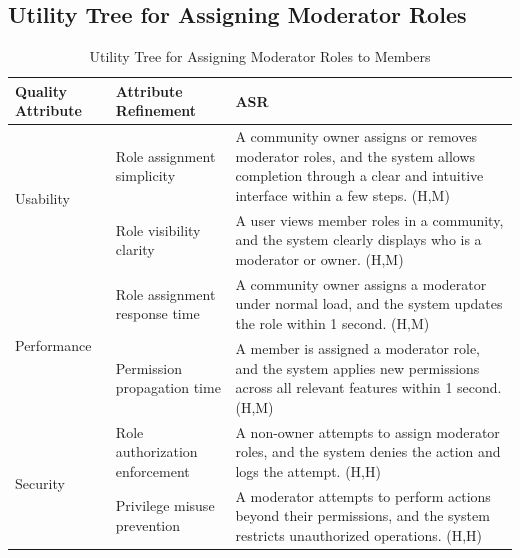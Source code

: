 \documentclass{article}
\begin{document}
\subsection{Utility Tree for Assigning Moderator Roles}

\begin{table}[H]
    \centering
    \caption{Utility Tree for Assigning Moderator Roles to Members}
    \begin{tabular}{|p{3cm}|p{4cm}|p{7cm}|}
        \hline
        \textbf{Quality Attribute} & \textbf{Attribute Refinement}                                                                                                                            & \textbf{ASR} \\
        \hline

        \multirow{2}{*}{Usability}
                                   & Role assignment simplicity
                                   & A community owner assigns or removes moderator roles, and the system allows completion through a clear and intuitive interface within a few steps. (H,M)                \\
        \cline{2-3}
                                   & Role visibility clarity
                                   & A user views member roles in a community, and the system clearly displays who is a moderator or owner. (H,M)                                                            \\
        \hline

        \multirow{2}{*}{Performance}
                                   & Role assignment response time
                                   & A community owner assigns a moderator under normal load, and the system updates the role within 1 second. (H,M)                                                         \\
        \cline{2-3}
                                   & Permission propagation time
                                   & A member is assigned a moderator role, and the system applies new permissions across all relevant features within 1 second. (H,M)                                       \\
        \hline

        \multirow{2}{*}{Security}
                                   & Role authorization enforcement
                                   & A non-owner attempts to assign moderator roles, and the system denies the action and logs the attempt. (H,H)                                                            \\
        \cline{2-3}
                                   & Privilege misuse prevention
                                   & A moderator attempts to perform actions beyond their permissions, and the system restricts unauthorized operations. (H,H)                                               \\
        \hline


\end{tabular}
\end{table}
\end{document}
